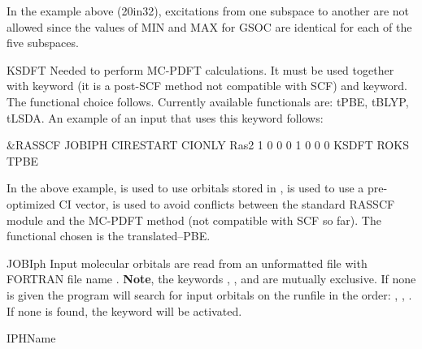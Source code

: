 \begin{keywordlist}
In the example above (20in32), excitations from one subspace to another are not allowed since
the values of MIN and MAX for GSOC are identical for each of the five subspaces.
\item[KSDFT]
Needed to perform MC-PDFT calculations. It must be used together with
 keyword (it is a post-SCF method not compatible with SCF) and  keyword.
The functional choice follows. Currently available functionals are: tPBE, tBLYP, tLSDA.
An example of an input that uses this keyword follows:
\begin{inputlisting}
&RASSCF
JOBIPH
CIRESTART
CIONLY
Ras2
1 0 0 0 1 0 0 0
KSDFT
ROKS
TPBE
\end{inputlisting}
In the above example,  is used to use orbitals stored in ,  is used to
use a pre-optimized CI vector,  is used to avoid conflicts between the standard RASSCF module
and the MC-PDFT method (not compatible with SCF so far). The functional chosen is the translated--PBE.
\item[JOBIph]
Input molecular orbitals are read from an unformatted file with
FORTRAN file name .
{\bf Note}, the keywords , , and
 are mutually exclusive. If none is given the program will
search for input orbitals on the runfile in the order: ,
, . If none is found, the keyword 
will be activated.
\item[IPHName]

\end{keywordlist}
